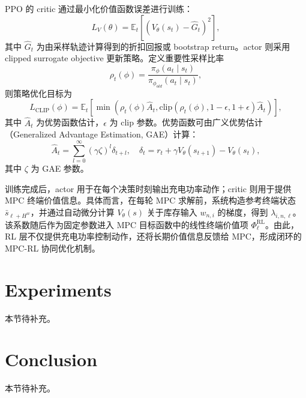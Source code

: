 \documentclass[12pt,hyperref,a4paper,UTF8]{ctexart}
\begin{document}
PPO 的 critic 通过最小化价值函数误差进行训练：
\begin{equation}
L_V(\theta)=
\mathbb{E}_t\left[
\left(V_{\theta}(s_t)-\hat{G}_t\right)^2
\right],
\label{eq:value_loss}
\end{equation}
其中 $\hat{G}_t$ 为由采样轨迹计算得到的折扣回报或 bootstrap return。actor 则采用 clipped surrogate objective 更新策略。定义重要性采样比率
\begin{equation}
\rho_t(\phi)=
\frac{\pi_{\phi}(a_t\mid s_t)}{\pi_{\phi_{old}}(a_t\mid s_t)},
\label{eq:ppo_ratio}
\end{equation}
则策略优化目标为
\begin{equation}
L_{\mathrm{CLIP}}(\phi)=
\mathbb{E}_t\left[
\min\left(
\rho_t(\phi)\hat{A}_t,
\mathrm{clip}(\rho_t(\phi),1-\epsilon,1+\epsilon)\hat{A}_t
\right)
\right],
\label{eq:ppo_clip}
\end{equation}
其中 $\hat{A}_t$ 为优势函数估计，$\epsilon$ 为 clip 参数。优势函数可由广义优势估计（Generalized Advantage Estimation, GAE）计算：
\begin{equation}
\hat{A}_t=\sum_{l=0}^{\infty}(\gamma\zeta)^l\delta_{t+l},
\quad
\delta_t=r_t+\gamma V_{\theta}(s_{t+1})-V_{\theta}(s_t),
\label{eq:gae}
\end{equation}
其中 $\zeta$ 为 GAE 参数。

训练完成后，actor 用于在每个决策时刻输出充电功率动作；critic 则用于提供 MPC 终端价值信息。具体而言，在每轮 MPC 求解前，系统构造参考终端状态 $\bar{s}_{\ell+H^w}$，并通过自动微分计算 $V_{\theta}(s)$ 关于库存输入 $w_{n,i}$ 的梯度，得到 $\lambda_{i,n,\ell}$。该系数随后作为固定参数进入 MPC 目标函数中的线性终端价值项 $\Phi_{\ell}^{\mathrm{RL}}$。由此，RL 层不仅提供充电功率控制动作，还将长期价值信息反馈给 MPC，形成闭环的 MPC-RL 协同优化机制。

\section{Experiments}

本节待补充。

\section{Conclusion}

本节待补充。


\end{document}
